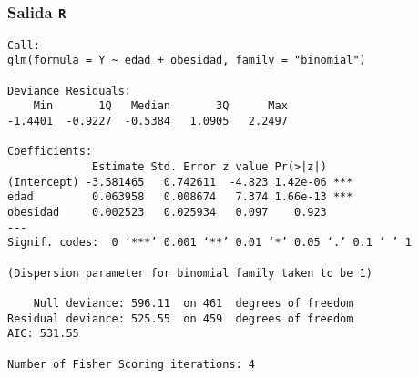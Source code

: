 \documentclass{beamer}
\begin{document}
\begin{frame}
\frametitle{Salida {\tt R}}

{\scriptsize
\begin{verbatim}
Call:
glm(formula = Y ~ edad + obesidad, family = "binomial")

Deviance Residuals: 
    Min       1Q   Median       3Q      Max  
-1.4401  -0.9227  -0.5384   1.0905   2.2497  

Coefficients:
             Estimate Std. Error z value Pr(>|z|)    
(Intercept) -3.581465   0.742611  -4.823 1.42e-06 ***
edad         0.063958   0.008674   7.374 1.66e-13 ***
obesidad     0.002523   0.025934   0.097    0.923    
---
Signif. codes:  0 ‘***’ 0.001 ‘**’ 0.01 ‘*’ 0.05 ‘.’ 0.1 ‘ ’ 1 

(Dispersion parameter for binomial family taken to be 1)

    Null deviance: 596.11  on 461  degrees of freedom
Residual deviance: 525.55  on 459  degrees of freedom
AIC: 531.55

Number of Fisher Scoring iterations: 4
\end{verbatim}
}

\end{frame}
\end{document}
